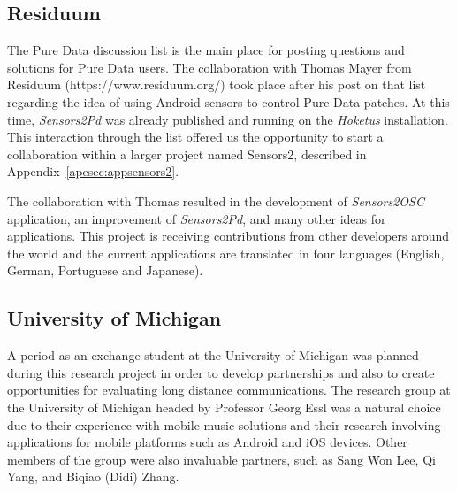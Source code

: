 \subsection*{Residuum}

The Pure Data discussion list is the main place for posting questions and solutions for Pure Data users.
The collaboration with Thomas Mayer from Residuum (https://www.residuum.org/) took place after his post on that list regarding the idea of using Android sensors to control Pure Data patches.
At this time, \textit{Sensors2Pd} was already published and running on the \textit{Hoketus} installation.
This interaction through the list offered us the opportunity to start a collaboration within a larger project named Sensors2, described in Appendix~\ref{apesec:appsensors2}.

The collaboration with Thomas resulted in the development of \textit{Sensors2OSC} application, an improvement of \textit{Sensors2Pd}, and many other ideas for applications.
This project is receiving contributions from other developers around the world and the current applications are translated in four languages (English, German, Portuguese and Japanese).

\subsection*{University of Michigan}


A period as an exchange student at the University of Michigan was planned during this research project in order to develop partnerships and also to create opportunities for evaluating long distance communications.
The research group at the University of Michigan headed by Professor Georg Essl was a natural choice due to their experience with mobile music solutions and their research involving applications for mobile platforms such as Android and iOS devices.
Other members of the group were also invaluable partners, such as Sang Won Lee, Qi Yang, and Biqiao (Didi) Zhang.

